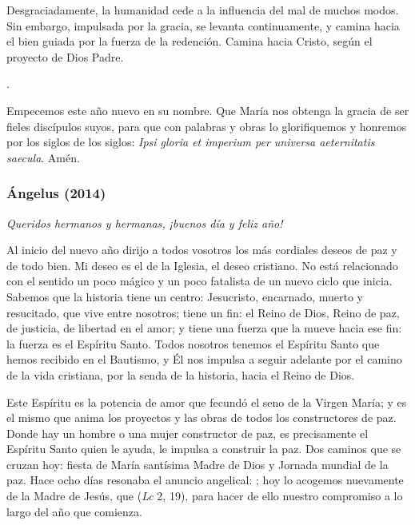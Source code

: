 Desgraciadamente, la humanidad cede a la influencia del mal de muchos modos. Sin embargo, impulsada por la gracia, se levanta continuamente, y camina hacia el bien guiada por la fuerza de la redención. Camina hacia Cristo, según el proyecto de Dios Padre.

.

Empecemos este año nuevo en su nombre. Que María nos obtenga la gracia de ser fieles discípulos suyos, para que con palabras y obras lo glorifiquemos y honremos por los siglos de los siglos: \emph{Ipsi gloria et imperium per universa aeternitatis saecula}. Amén.

\subsubsection{Ángelus (2014)} \emph{Queridos hermanos y hermanas, ¡buenos día y feliz año!}

Al inicio del nuevo año dirijo a todos vosotros los más cordiales deseos de paz y de todo bien. Mi deseo es el de la Iglesia, el deseo cristiano. No está relacionado con el sentido un poco mágico y un poco fatalista de un nuevo ciclo que inicia. Sabemos que la historia tiene un centro: Jesucristo, encarnado, muerto y resucitado, que vive entre nosotros; tiene un fin: el Reino de Dios, Reino de paz, de justicia, de libertad en el amor; y tiene una fuerza que la mueve hacia ese fin: la fuerza es el Espíritu Santo. Todos nosotros tenemos el Espíritu Santo que hemos recibido en el Bautismo, y Él nos impulsa a seguir adelante por el camino de la vida cristiana, por la senda de la historia, hacia el Reino de Dios.

Este Espíritu es la potencia de amor que fecundó el seno de la Virgen María; y es el mismo que anima los proyectos y las obras de todos los constructores de paz. Donde hay un hombre o una mujer constructor de paz, es precisamente el Espíritu Santo quien le ayuda, le impulsa a construir la paz. Dos caminos que se cruzan hoy: fiesta de María santísima Madre de Dios y Jornada mundial de la paz. Hace ocho días resonaba el anuncio angelical: ; hoy lo acogemos nuevamente de la Madre de Jesús, que  (\emph{Lc} 2, 19), para hacer de ello nuestro compromiso a lo largo del año que comienza.

